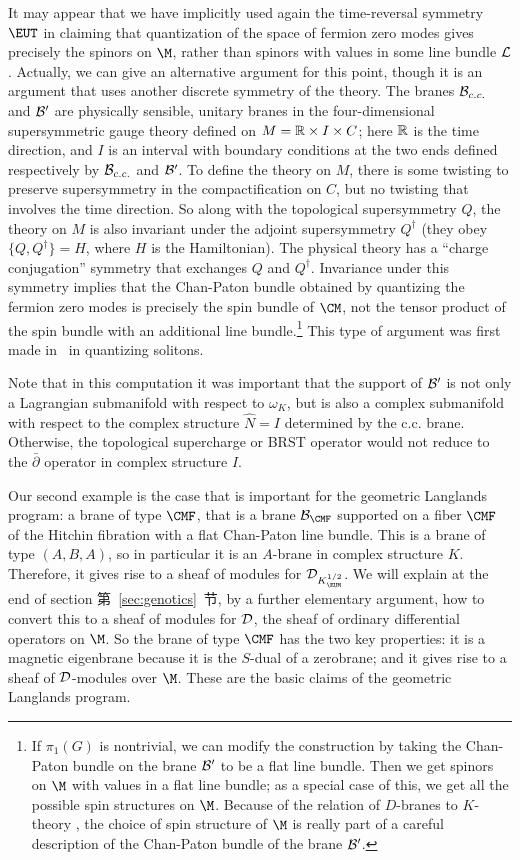 It may appear that we have implicitly used again the time-reversal
symmetry $\EUT$ in claiming that quantization of the space of
fermion zero modes gives precisely the spinors on $\M$, rather
than spinors with values in some line bundle ${\cal L}$. Actually,
we can give an alternative argument for this point, though it is
an argument that uses another discrete symmetry of the theory. The
branes ${\cal B}_{c.c.}$ and ${\cal B}'$ are physically sensible,
unitary branes in the four-dimensional supersymmetric gauge theory
defined on $M=\Bbb{R}\times I\times C$; here $\Bbb{R}$ is the time
direction, and $I$ is an interval with boundary conditions at the
two ends defined respectively by ${\cal B}_{c.c.}$ and ${\cal
B}'$.    To define the theory on $M$, there is some twisting to
preserve supersymmetry in the compactification on $C$, but no
twisting that involves the time direction.  So along with the
topological supersymmetry $Q$, the theory on $M$ is also invariant
under the adjoint supersymmetry $Q^\dagger$ (they obey
$\{Q,Q^\dagger\}=H$, where $H$ is the Hamiltonian).  The physical
theory has a  ``charge conjugation'' symmetry that exchanges $Q$
and $Q^\dagger$.  Invariance under this symmetry implies that the
Chan-Paton bundle obtained by quantizing the fermion zero modes is
precisely the spin bundle of $\CM$, not the tensor product of the
spin bundle with an additional line bundle.\footnote{If $\pi_1(G)$ is
nontrivial, we can modify the construction by taking the
Chan-Paton bundle on the brane ${\cal B}'$ to be a flat line
bundle.  Then we get spinors on $\M$ with values in a flat line
bundle; as a special case of this, we get all the possible spin
structures on $\M$. Because of the relation of $D$-branes to
$K$-theory \cite{ref102}, the choice of spin structure of $\M$ is really
part of a careful description of the Chan-Paton bundle of the
brane ${\cal B}'$.} This type of argument was first made in
\cite{ref145}\ in quantizing solitons.

Note that in this computation it was important that the support of
${\cal B}'$ is not only a Lagrangian submanifold with respect to
$\omega_K$, but is also a complex submanifold with respect to the
complex structure $\hat N=I$ determined by the c.c. brane. Otherwise,
the topological supercharge or BRST operator would not reduce to the $\bar\partial$ operator
in complex structure $I$.

Our second example is the case that is important for the geometric
Langlands program: a brane of type ${\CMF}$, that is a brane
${\cal B}_{\CMF}$ supported on a fiber ${\CMF}$ of the Hitchin
fibration with a flat Chan-Paton line bundle.  This is a brane of
type $(A,B,A)$, so in particular it is an $A$-brane in complex
structure $K$. Therefore, it gives rise to a sheaf of modules for
${\cal D}_{K_{ \EUM}^{1/2}}$. We will explain at the end of
section 第~\ref{sec:genotics}~节, by a further elementary argument, how to
convert this to a sheaf of modules for ${\cal D}$, the sheaf of
ordinary differential operators on $\M$. So the brane of type
${\CMF}$ has the two key properties: it is a magnetic eigenbrane
because it is the $S$-dual of a zerobrane; and it gives rise to a
sheaf of ${\cal D}$-modules over $\M$.  These are the basic claims
of the geometric Langlands program.

